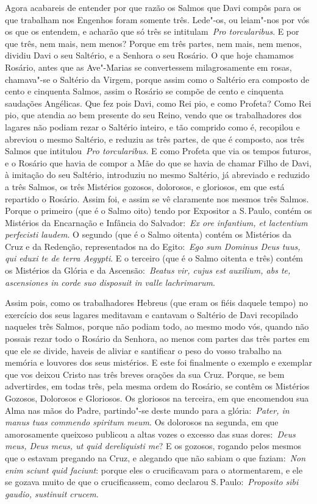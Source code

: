 Agora acabareis de entender por que razão os Salmos que
Davi compôs para os que trabalham nos Engenhos foram somente três.
Lede"-os, ou leiam"-nos por vós os que os entendem, e acharão que só três
se intitulam~\emph{Pro torcularibus}. E por que três, nem mais, nem
menos? Porque em três partes, nem mais, nem menos, dividiu Davi o seu
Saltério, e a Senhora o seu Rosário. O que hoje chamamos Rosário, antes
que as Ave"-Marias se convertessem milagrosamente em rosas, chamava"-se o
Saltério da Virgem, porque assim como o Saltério era composto de cento e
cinquenta Salmos, assim o Rosário se compõe de cento e cinquenta
saudações Angélicas. Que fez pois Davi, como Rei pio, e como Profeta?
Como Rei pio, que atendia ao bem presente do seu Reino, vendo que os
trabalhadores dos lagares não podiam rezar o Saltério inteiro, e tão
comprido como é, recopilou e abreviou o mesmo Saltério, e reduziu as
três partes, de que é composto, aos três Salmos que intitulou~\emph{Pro
torcularibus}. E como Profeta que via os tempos futuros, e o Rosário que
havia de compor a Mãe do que se havia de chamar Filho de Davi, à
imitação do seu Saltério, introduziu no mesmo Saltério, já abreviado e
reduzido a três Salmos, os três Mistérios gozosos, dolorosos, e
gloriosos, em que está repartido o Rosário. Assim foi, e assim se vê
claramente nos mesmos três Salmos. Porque o primeiro (que é o Salmo
oito) tendo por Expositor a S.\,Paulo, contém os Mistérios da Encarnação
e Infância do Salvador:~\emph{Ex ore infantium, et lactentium perfecisti
laudem}. O segundo (que é o Salmo oitenta) contém os
Mistérios da Cruz e da Redenção, representados na do Egito:~\emph{Ego
sum Dominus Deus tuus, qui eduxi te de terra Aegypti}.
E o terceiro (que é o Salmo oitenta e três) contém os Mistérios da
Glória e da Ascensão:~\emph{Beatus vir, cujus est auxilium, abs te,
ascensiones in corde suo disposuit in valle
lachrimarum}.


Assim pois, como os trabalhadores Hebreus (que eram os
fiéis daquele tempo) no exercício dos seus lagares meditavam e cantavam
o Saltério de Davi recopilado naqueles três Salmos, porque não podiam
todo, ao mesmo modo vós, quando não possais rezar todo o Rosário da
Senhora, ao menos com partes das três partes em que ele se divide,
haveis de aliviar e santificar o peso do vosso trabalho na memória e
louvores dos seus mistérios. E este foi finalmente o exemplo e exemplar
que vos deixou Cristo nas três breves orações da sua Cruz. Porque, se
bem advertirdes, em todas três, pela mesma ordem do Rosário, se contêm
os Mistérios Gozosos, Dolorosos e Gloriosos. Os gloriosos na terceira,
em que encomendou sua Alma nas mãos do Padre, partindo"-se deste mundo
para a glória:~\emph{Pater, in manus tuas commendo spiritum
meum}. Os dolorosos na segunda, em que amorosamente
queixoso publicou a altas vozes o excesso das suas dores:~\emph{Deus
meus, Deus meus, ut quid dereliquisti me}? E os
gozosos, rogando pelos mesmos que o estavam pregando na Cruz, e alegando
que não sabiam o que faziam:~\emph{Non enim sciunt quid
faciunt}: porque eles o crucificavam para o
atormentarem, e ele se gozava muito de que o crucificassem, como
declarou S.\,Paulo:~\emph{Proposito sibi gaudio, sustinuit
crucem}.


